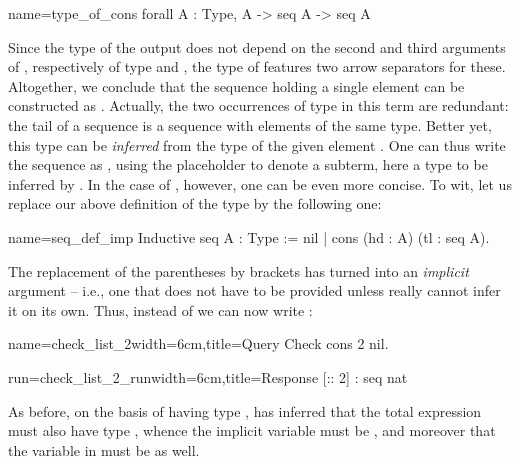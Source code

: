 \begin{coq}{name=type_of_cons}{}
  forall A : Type, A -> seq A -> seq A
\end{coq}
 Since the type of
the output does not depend on the second and third arguments of
, respectively of type  and , the type of
 features two arrow separators for these.
Altogether, we conclude
that the sequence holding a single element  can be
constructed as
. Actually, the two
occurrences of type  in this term are redundant: the tail of a
sequence is a sequence with elements of the same type. Better yet,
this type can be
\emph{inferred} from the type of the given element . One can
thus write the sequence as  , using the
placeholder \C{_} to denote a subterm, here a type to be inferred
by \Coq{}.
In the case of , however, one can be even more concise.
To wit, let us replace our above definition of the  type
by the following one:

\begin{coq}{name=seq_def_imp}{}
Inductive seq {A : Type} := nil | cons (hd : A) (tl : seq A).
\end{coq}

The replacement of the  parentheses by 
brackets has turned  into an \emph{implicit} argument
-- i.e., one that does not have to be provided unless
\Coq{} really cannot infer it on its own.  Thus, instead of
 we can now write :

\begin{coq-left}{name=check_list_2}{width=6cm,title=Query}
Check cons 2 nil.
\end{coq-left}
\begin{coqout-right}{run=check_list_2_run}{width=6cm,title=Response}
[:: 2] : seq nat
\end{coqout-right}
\index[coq]{\C{(_ :: _)}}
As before, on the basis of  having type ,
\Coq{} has inferred that the total expression
 must also have type , whence
the implicit  variable must be , and moreover
that the  variable in  must be  as well.

